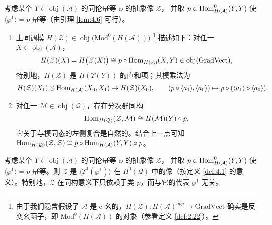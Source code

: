 \begin{Lem}\label{lem:4.8}
考虑某个 $Y\in\operatorname{obj}(\mathcal A)$ 的同伦幂等 $\wp$ 的抽象像 $\mathcal Z$，
并取 $p\in\operatorname{Hom}^0_{H(\mathcal A)}(Y,Y)$ 使 $\langle\wp^1\rangle=p$ 幂等（由引理
\ref{lem:4.6} 可行）。
\begin{enumerate}[label=\textup{\roman*}.,leftmargin=*]
  \item 上同调模 $H(\mathcal Z)\in\operatorname{obj}\bigl(\mathrm{Mod}^0(H(\mathcal A))\bigr)$%
        \footnote{由于我们隐含假设了 $\mathcal A$ 是 c-幺的，$H(\mathcal Z):
        H(\mathcal A)^{opp}\to\mathrm{GradVect}$ 确实是反变幺函子，即
        $\mathrm{Mod}^0(H(\mathcal A))$ 的对象（参看定义 \ref{def:2.22}）。}
        描述如下：对任一 $X\in\operatorname{obj}(\mathcal A)$，
        \[
          H(\mathcal Z)(X)=H\bigl(\mathcal Z(X)\bigr)
          \cong p\circ\operatorname{Hom}_{H(\mathcal A)}(X,Y)
          \in\operatorname{obj}(\mathrm{GradVect}),
        \]
        特别地，$H(\mathcal Z)$ 是 $H(\Upsilon(Y))$ 的直和项；其模乘法为
        \[
          H(\mathcal Z)(X_1)\otimes\operatorname{Hom}_{H(\mathcal A)}(X_0,X_1)
          \to H(\mathcal Z)(X_0),\qquad
          (p\circ\langle a_1\rangle,\langle a_0\rangle)
          \mapsto p\circ(\langle a_1\rangle\circ\langle a_0\rangle).
        \]
  \item 对任一 $\mathcal M\in\operatorname{obj}(\mathcal Q)$，存在分次群同构
        \[
          \operatorname{Hom}_{H(\mathcal Q)}(\mathcal Z,\mathcal M)\cong H(\mathcal M)(Y)\circ p,
        \]
        它关于与模同态的左侧复合是自然的。结合上一点可知
        $\operatorname{Hom}_{H(\mathcal Q)}(\mathcal Z,\mathcal Z)
        \cong p\circ\operatorname{Hom}_{H(\mathcal A)}(Y,Y)\circ p$。
\end{enumerate}
\end{Lem}

\begin{Cor}\label{cor:4.9}
考虑某个 $Y\in\operatorname{obj}(\mathcal A)$ 的同伦幂等 $\wp$ 的抽象像 $\mathcal Z$，
并取 $p\in\operatorname{Hom}^0_{H(\mathcal A)}(Y,Y)$ 使 $\langle\wp^1\rangle=p$ 幂等。则 $\mathcal Z$
是 $\langle\Upsilon^1(\wp^1)\rangle$ 在 $H^0(\mathcal Q)$ 中的像（按定义 \ref{def:4.1}
的意义）。特别地，$\mathcal Z$ 在同构意义下只依赖于类 $p$，而与它的代表 $\wp^1$ 无关。
\end{Cor}

